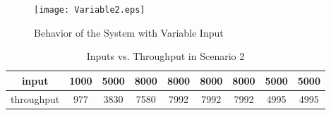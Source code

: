 \documentclass[12 pt]{article}
\newcommand{\debug}[1]{\mbox{\tt #1}}
\renewcommand{\debug}[1]{}              \newcommand{\cmd}[1]{}
\begin{document}
\begin{figure}[hbtp]
\begin{center}
\texttt{[image: Variable2.eps]}
\caption{Behavior of the System with Variable Input \debug{\fbox{fig-Variable2}}}
\end{center}
\end{figure}

\begin{table}[hbtp]
\begin{center}
\begin{tabular}{|c|c|c|c|c|c|c|c|c|}
  \hline
input & 1000 &  5000  &  8000 & 8000 & 8000 & 8000 & 5000 &5000 \\ \hline
throughput &977 &    3830 & 7580 & 7992 & 7992 & 7992 & 4995 & 4995 \\ \hline
\end{tabular}
\caption{Inputs vs. Throughput in Scenario 2\debug{\fbox{Table-Thru2}}}
\end{center}
\end{table}
\end{document}
